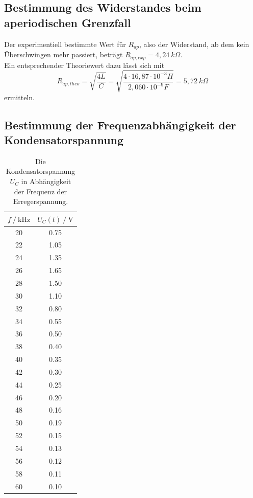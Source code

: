 \subsection{Bestimmung des Widerstandes beim aperiodischen Grenzfall}
\label{R_ap}

Der experimentiell bestimmte Wert für $R_{ap}$, also der Widerstand, ab dem kein Überschwingen mehr passiert, beträgt $R_{ap,exp} = 4,24 \: k\Omega$. \\
Ein entsprechender Theoriewert dazu lässt sich mit 
\begin{equation*}
  R_{ap,theo} = \sqrt{\frac{4L}{C}} = \sqrt{\frac{4 \cdot 16,87 \cdot 10^{-3}H}{2,060 \cdot 10^{-9}F}} = 5,72 \: k\Omega
\end{equation*}
ermitteln.






\subsection{Bestimmung der Frequenzabhängigkeit der Kondensatorspannung}
\label{Kondensatorspannung}

\begin{table}[H]
  \centering
  \caption{Die Kondensatorspannung $U_C$ in Abhängigkeit der Frequenz der Erregerspannung.}
  \begin{tabular}{cc}
    \toprule
    {$f \mathbin{/} \unit{\kilo\hertz}$} &
    {$U_C(t) \mathbin{/} \unit{\volt}$} \\
    \midrule
    20 & 0.75 \\
    22 & 1.05 \\
    24 & 1.35 \\
    26 & 1.65 \\
    28 & 1.50 \\
    30 & 1.10 \\
    32 & 0.80 \\
    34 & 0.55 \\
    36 & 0.50 \\
    38 & 0.40 \\
    40 & 0.35 \\
    42 & 0.30 \\
    44 & 0.25 \\
    46 & 0.20 \\
    48 & 0.16 \\
    50 & 0.19 \\
    52 & 0.15 \\
    54 & 0.13 \\
    56 & 0.12 \\
    58 & 0.11 \\
    60 & 0.10 \\

    \bottomrule
  \end{tabular}
  \label{tab:Tabelle1}
\end{table}


